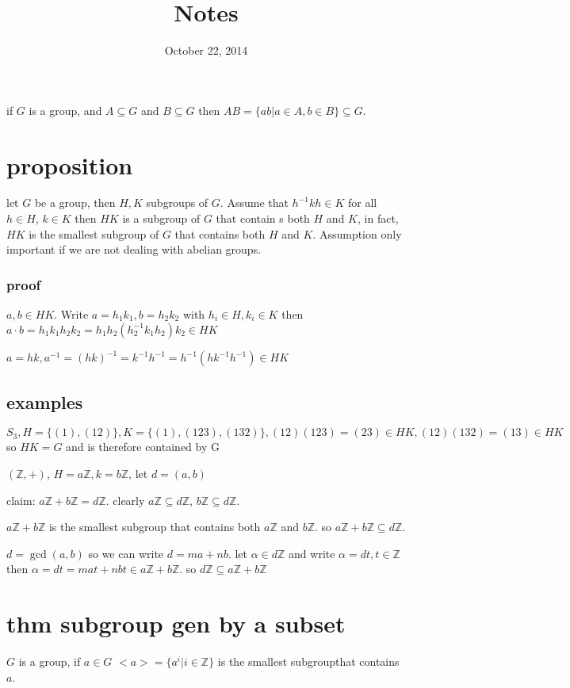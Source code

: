 \documentclass[letterpaper]{article}
\begin{document}
\title{Notes}
\date{October 22, 2014}
\maketitle
if $G$ is a group, and $A\subseteq G$ and $B\subseteq G$ then $AB=\{ab|a\in A, b\in B\}\subseteq G$.

\section*{proposition}

let $G$ be a group, then $H,K$ subgroups of $G$. Assume that $h^{-1}kh\in K$ for all $h\in H$, $k\in K$ then $HK$ is a subgroup of $G$ that contain s both $H$ and $K$, in fact, $HK$ is the smallest subgroup of $G$ that contains both $H$ and $K$. Assumption only important if we are not dealing with abelian groups.

\subsubsection*{proof}
$a,b\in HK$. Write $a=h_1k_1,b=h_2k_2$ with $h_i\in H,k_i\in K$ then $a\cdot b=h_1k_1h_2k_2=h_1h_2(h_2^{-1}k_1h_2)k_2\in HK$

$a=hk, a^{-1}=(hk)^{-1}=k^{-1}h^{-1}=h^{-1}(hk^{-1}h^{-1})\in HK$

\subsection*{examples}
$S_3, H=\{(1),(12)\}, K=\{(1),(123),(132)\}, (12)(123)=(23)\in HK, (12)(132)=(13)\in HK$ so $HK=G$ and is therefore contained by G

$(\mathbb{Z},+)$, $H=a\mathbb{Z}, k=b\mathbb{Z}$, let $d=(a,b)$

claim: $a\mathbb{Z}+b\mathbb{Z}=d\mathbb{Z}$. clearly $a\mathbb{Z}\subseteq d\mathbb{Z}$, $b\mathbb{Z}\subseteq d\mathbb{Z}$. 

$a\mathbb{Z}+b\mathbb{Z}$ is the smallest subgroup that contains both $a\mathbb{Z}$ and $b\mathbb{Z}$. so $a\mathbb{Z}+b\mathbb{Z}\subseteq d\mathbb{Z}$.

$d=\gcd(a,b)$ so we can write $d=ma+nb$. let $\alpha\in d\mathbb{Z}$ and write $\alpha=dt, t\in \mathbb{Z}$ then $\alpha=dt=mat+nbt\in a\mathbb{Z}+b\mathbb{Z}$. so $d\mathbb{Z}\subseteq a\mathbb{Z}+b\mathbb{Z}$ 
\section*{thm subgroup gen by a subset}
$G$ is a group, if $a\in G$ $<a>=\{a^i|i\in \mathbb{Z}\}$ is the smallest subgroupthat contains $a$.
\end{document}
